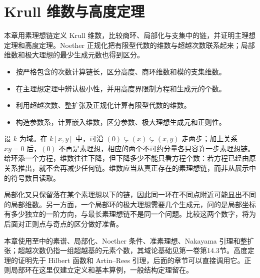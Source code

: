 
\chapter{Krull 维数与高度定理}
\label{b3:ch:09}

\begin{chapterabstract}
	本章用素理想链定义 Krull 维数，比较商环、局部化与支集中的链，并证明主理想定理和高度定理。Noether 正规化把有限型代数的维数与超越次数联系起来；局部维数和极大理想的最少生成元数也得到区分。
\end{chapterabstract}

\begin{learninggoals}
	\begin{itemize}
		\item 按严格包含的次数计算链长，区分高度、商环维数和模的支集维数。
		\item 在主理想定理中辨认极小性，并用高度界限制方程和生成元的个数。
		\item 利用超越次数、整扩张及正规化计算有限型代数的维数。
		\item 构造参数系，计算嵌入维数，区分参数、极大理想生成元和正则性。
	\end{itemize}
\end{learninggoals}

设 \(k\) 为域。在 \(k[x,y]\) 中，可沿 \((0)\subsetneq(x)\subsetneq(x,y)\) 走两步；加上关系 \(xy=0\) 后，\((0)\) 不再是素理想，相应的两个不可约分量各只容许一步素理想链。给环添一个方程，维数往往下降，但下降多少不能只看方程个数：若方程已经由原关系推出，就不会再减少任何链。维数应当从真正存在的素理想链，而非从展示中的符号数目读取。

\ProseParagraphBreak

局部化又只保留落在某个素理想以下的链，因此同一环在不同点附近可能显出不同的局部维数。另一方面，一个局部环的极大理想需要几个生成元，问的是局部坐标有多少独立的一阶方向，与最长素理想链不是同一个问题。比较这两个数字，将为后面对正则点与奇点的区分做好准备。

\ProseParagraphBreak

本章使用至中的素谱、局部化、Noether 条件、准素理想、Nakayama 引理和整扩张；超越次数仍指一组超越基的元素个数，其域论基础见第一卷第14.3节。高度定理的证明先于 Hilbert 函数和 Artin--Rees 引理，后面的章节可以直接调用它。正则局部环在这里仅建立定义和基本算例，一般结构定理留在。

